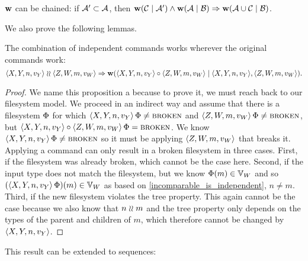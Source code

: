 \begin{mycor}\label{workschained}
$\mathbf{w}$ can be chained:
if $\mathcal{A'}\subset\mathcal{A}$, then
$ \mathbf{w}({\mathcal{C}}\mathrel{|}{\mathcal{A'}}) \wedge \mathbf{w}({\mathcal{A}}\mathrel{|}{\mathcal{B}}) \Rightarrow \mathbf{w}({\mathcal{A}\cup\mathcal{C}}\mathrel{|}{\mathcal{B}})$.
\end{mycor}

We also prove the following lemmas.

\begin{myax}\label{combine_independent_commands}
The combination of independent commands works wherever the original commands work:
\[ \langle{X,Y,n,v_Y}\rangle\mathrel{\wr\wr} \langle{Z,W,m,v_W}\rangle \Rightarrow \mathbf{w}({\langle{X,Y,n,v_Y}\rangle\circ \langle{Z,W,m,v_W}\rangle}\mathrel{|}{\langle{X,Y,n,v_Y}\rangle, \langle{Z,W,m,v_W}\rangle}). \]
\end{myax}
\begin{proof}
We name this proposition a  
because to prove it, we must reach back to our filesystem model.
We proceed in an indirect way and
assume that there is a filesystem $\Phi$ for which
$\langle{X,Y,n,v_Y}\rangle\,\Phi\neq\text{\normalfont\scshape{broken}}$ and $\langle{Z,W,m,v_W}\rangle\,\Phi\neq\text{\normalfont\scshape{broken}}$, but
$\langle{X,Y,n,v_Y}\rangle\circ \langle{Z,W,m,v_W}\rangle\,\Phi=\text{\normalfont\scshape{broken}}$.
We know $\langle{X,Y,n,v_Y}\rangle\,\Phi\neq\text{\normalfont\scshape{broken}}$ so it must be applying 
$\langle{Z,W,m,v_W}\rangle$ that breaks it.
Applying a command can only result in a broken filesystem in three cases.
First, if the filesystem was already broken, which cannot be the case here.
Second, if the input type does not match the filesystem,
but we know $\Phi(m)\in\mathbb{V}_{W}$ and so
$(\langle{X,Y,n,v_Y}\rangle\,\Phi)(m)\in\mathbb{V}_{W}$ as based on \cref{incomparable_is_independent}, $n\neq m$.
Third, if the new filesystem violates the tree property.
This again cannot be the case because we also know that $n\mathrel{\wr\wr} m$
and the tree property only depends on the types of the parent and children of $m$,
which therefore cannot be changed by $\langle{X,Y,n,v_Y}\rangle$.
\end{proof}

This result can be extended to sequences:

